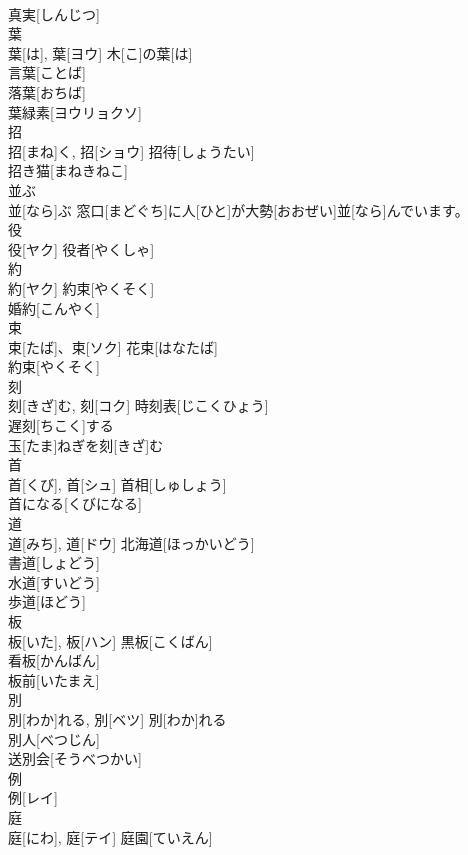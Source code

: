 \documentclass[8pt]{extreport}
\begin{document}
\begin{CJK}{UTF8}{min}
\\	真実[しんじつ] 
\\	葉	
\\	葉[は], 葉[ヨウ]	木[こ]の葉[は] 
\\	言葉[ことば] 
\\	落葉[おちば] 
\\	葉緑素[ヨウリョクソ] 
\\	招	
\\	招[まね]く, 招[ショウ]	招待[しょうたい] 
\\	招き猫[まねきねこ] 
\\	並ぶ	
\\	並[なら]ぶ	窓口[まどぐち]に人[ひと]が大勢[おおぜい]並[なら]んでいます。
\\	役	
\\	役[ヤク]	役者[やくしゃ] 
\\	約	
\\	約[ヤク]	約束[やくそく] 
\\	婚約[こんやく] 
\\	束	
\\	束[たば]、束[ソク]	花束[はなたば] 
\\	約束[やくそく] 
\\	刻	
\\	刻[きざ]む, 刻[コク]	時刻表[じこくひょう] 
\\	遅刻[ちこく]する 
\\	玉[たま]ねぎを刻[きざ]む 
\\	首	
\\	首[くび], 首[シュ]	首相[しゅしょう] 
\\	首になる[くびになる] 
\\	道	
\\	道[みち], 道[ドウ]	北海道[ほっかいどう] 
\\	書道[しょどう] 
\\	水道[すいどう] 
\\	歩道[ほどう] 
\\	板	
\\	板[いた], 板[ハン]	黒板[こくばん]
\\	看板[かんばん] 
\\	板前[いたまえ] 
\\	別	
\\	別[わか]れる, 別[ベツ]	別[わか]れる 
\\	別人[べつじん] 
\\	送別会[そうべつかい] 
\\	例	
\\	例[レイ]	
\\	庭	
\\	庭[にわ], 庭[テイ]	庭園[ていえん] 

\end{CJK}
\end{document}

